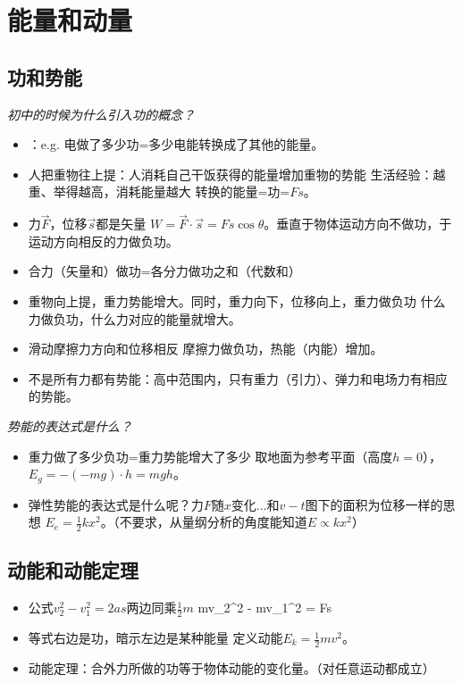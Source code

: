 \documentclass[a4paper,9pt]{ctexart}
\begin{document}
\newpage
\section{能量和动量}
\subsection{功和势能}
\emph{初中的时候为什么引入功的概念？}
\begin{itemize}
\item
{}：e.g. 电做了多少功=多少电能转换成了其他的能量。
\item
人把重物往上提：人消耗自己干饭获得的能量增加重物的势能 \so 生活经验：越重、举得越高，消耗能量越大 \so 转换的能量=功=$Fs$。
\item
力$\vec F$，位移$\vec s$都是矢量 \so $W = \vec F \cdot \vec s = Fs \cos \theta$。\so 垂直于物体运动方向不做功，于运动方向相反的力做负功。
\item
合力（矢量和）做功=各分力做功之和（代数和）
\item
重物向上提，重力势能增大。同时，重力向下，位移向上，重力做负功 \so 什么力做负功，什么力对应的能量就增大。
\item
滑动摩擦力方向和位移相反 \so 摩擦力做负功，热能（内能）增加。
\item
不是所有力都有势能：高中范围内，只有重力（引力）、弹力和电场力有相应的势能。
\end{itemize}
\emph{势能的表达式是什么？}
\begin{itemize}
\item
重力做了多少负功=重力势能增大了多少 \so 取地面为参考平面（高度$h = 0$），$E_g = -(-mg)\cdot h = mgh$。
\item
弹性势能的表达式是什么呢？力$F$随$x$变化...和$v-t$图下的面积为位移一样的思想 \so $E_e = \frac{1}{2}kx^2$。（不要求，从量纲分析的角度能知道$E\propto kx^2$）
\end{itemize}

\subsection{动能和动能定理}
\begin{itemize}
\item
公式$v^2_2 - v_1^2 = 2as$两边同乘$\frac{1}{2}m$ \so 
\beq
{}mv_2^2 - mv_1^2 = Fs
\eeq
\item
等式右边是功，暗示左边是某种能量 \so 定义动能$E_k = \frac{1}{2}mv^2$。
\item
动能定理：合外力所做的功等于物体动能的变化量。（对任意运动都成立）
\end{itemize}
\end{document}
